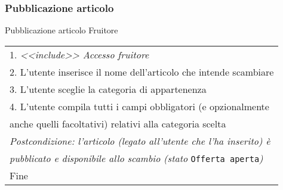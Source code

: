 \begin{minipage}{\textwidth}
    \subsubsection{Pubblicazione articolo}
    \usecase
        {Pubblicazione articolo}
        {
            Fruitore %
        }
        {
            \begin{tabular}{l}
                1. \textit{<<include>> Accesso fruitore}\\
                2. L'utente inserisce il nome dell'articolo che intende scambiare\\
                3. L'utente sceglie la categoria di appartenenza\\
                4. L'utente compila tutti i campi obbligatori (e opzionalmente\\anche quelli facoltativi) relativi alla categoria scelta\\
                \textit{Postcondizione: l'articolo (legato all'utente che l'ha inserito) è}\\
                \textit{pubblicato e disponibile allo scambio (stato }\texttt{Offerta aperta}\textit{)}\\
                Fine
            \end{tabular}\\


        }
        \vspace{0.5cm}
\end{minipage}